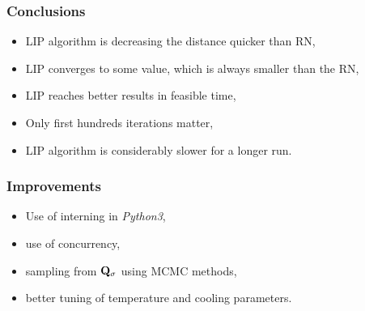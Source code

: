 \begin{frame}
	\frametitle{Conclusions}
	\begin{itemize}
		\item LIP algorithm is decreasing the distance quicker than RN,
		\item LIP converges to some value, which is always smaller than the RN,
		\item LIP reaches better results in feasible time,
		\item Only first hundreds iterations matter,
		\item LIP algorithm is considerably slower for a longer run.
	\end{itemize}
\end{frame}

\begin{frame}
	\frametitle{Improvements}
	\begin{itemize}
		\item Use of interning in \textit{Python3},
		\item use of concurrency,
		\item sampling from $\mathbf{Q}_{\sigma}$ using MCMC methods,
		\item better tuning of temperature and cooling parameters.
	\end{itemize}
\end{frame}